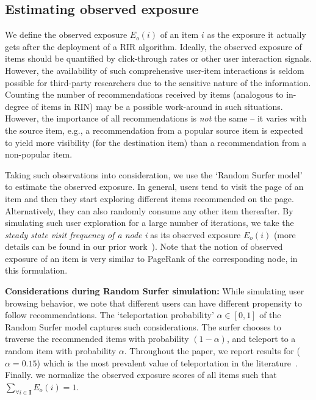 \subsection{Estimating observed exposure}\label{sec: EstOexp}

We define the observed exposure $E_o(i)$ of an item $i$ as the exposure it actually gets after the deployment of a RIR algorithm.
Ideally, the observed exposure of items should be quantified by click-through rates or other user interaction signals.
However, the availability of such comprehensive user-item interactions is seldom possible for third-party researchers due to the sensitive nature of the information.
Counting the number of recommendations received by items (analogous to in-degree of items in RIN) may be a possible work-around in such situations. 
However, the importance of all recommendations is {\it not} the same -- %
it varies with the source item, e.g., a recommendation from a popular source item is expected to yield more visibility (for the destination item) than a recommendation from a non-popular item.
 
Taking such observations into consideration, we use the `Random Surfer model'~\cite{random-surfer-model} to estimate the observed exposure. 
In general, users tend to visit the page of an item and then they start exploring different items recommended on the page. Alternatively, they can also randomly consume any other item thereafter. 
By simulating such user exploration for a large number of iterations, we take the {\it steady state visit frequency of a node} \textit{i} as its observed exposure $E_o(i)$ (more details can be found in our prior work~\cite{dash2021umpire}). Note that the notion of observed exposure of an item is very similar to PageRank of the corresponding node, in this formulation.


\vspace{1mm} \noindent
\textbf{Considerations during Random Surfer simulation: }
While simulating user browsing behavior, we note that different users can have different propensity to follow recommendations. 
The `teleportation probability' $\alpha \in [0, 1]$ of the Random Surfer model captures such considerations. 
The surfer chooses to traverse the recommended items with probability $(1 - \alpha)$, and teleport to a random item with probability $\alpha$. Throughout the paper, we report results for ($\alpha = 0.15$) which is the most prevalent value of teleportation in the literature~\cite{dash2021umpire, Brin98theanatomy}. Finally. we normalize the observed 
exposure scores of all items %
such that $\sum_{\forall i \in \mathbf{I}}^{}{E_o(i)} = 1$.